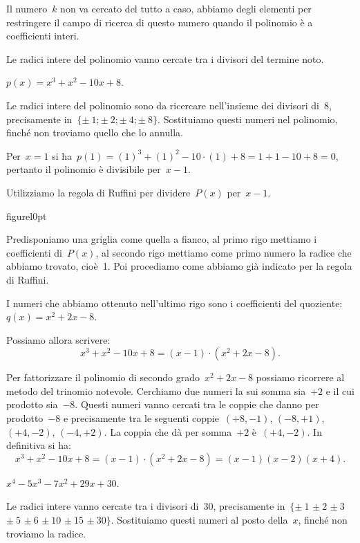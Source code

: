 Il numero~$k$ non va cercato del tutto a caso, abbiamo degli elementi per
restringere il campo di ricerca di questo numero quando il polinomio
è a coefficienti interi.

\osservazione Le radici intere del polinomio vanno cercate tra i divisori del 
termine noto.

\begin{exrig}
 \begin{esempio}
 $p(x)=x^{3}+x^{2}-10x+8$.
 \end{esempio}
Le radici intere del polinomio sono da ricercare
nell'insieme dei divisori di~8, precisamente in~$\{\pm~1;\pm~2;\pm~4;\pm~8\}$.
Sostituiamo questi numeri nel polinomio,
finché non troviamo quello che lo annulla.

Per~$x=1$ si ha~$p(1)=(1)^{3}+(1)^{2}-10\cdot (1)+8=1+1-10+8=0$,
pertanto il polinomio è divisibile per~$x-1$.

Utilizziamo la regola di Ruffini per dividere~$P(x)$ per~$x-1$.

\begin{wrapfloat}{figure}{l}{0pt}
 
\end{wrapfloat}

Predisponiamo una griglia come quella a fianco, al primo rigo mettiamo i
coefficienti di~$P(x)$, al secondo rigo mettiamo come primo numero la
radice che abbiamo trovato, cioè~1. Poi procediamo come abbiamo già
indicato per la regola di Ruffini.

I numeri che abbiamo ottenuto nell'ultimo rigo sono i
coefficienti del quoziente: $q(x)=x^{2}+2x-8$.

Possiamo allora scrivere:
\[x^{3}+x^{2}-10x+8=(x-1)\cdot (x^{2}+2x-8).\]

Per fattorizzare il polinomio di secondo grado~$x^{2}+2x-8$ possiamo
ricorrere al metodo del trinomio notevole. Cerchiamo due numeri la sui
somma sia~$+2$ e il cui prodotto sia~$-8$. Questi numeri vanno cercati tra
le coppie che danno per prodotto~$-8$ e precisamente tra le seguenti
coppie~$(+8, -1)$, $(-8, +1)$, $(+4, -2)$, $(-4, +2)$. La coppia che dà per
somma~$+2$ è~$(+4, -2)$. In definitiva si ha:
\[x^{3}+x^{2}-10x+8=(x-1)\cdot (x^{2}+2x-8)=(x-1)(x-2)(x+4).\]


 \begin{esempio}
$x^{4}-5x^{3}-7x^{2}+29x+30$.
\end{esempio}

Le radici intere vanno cercate tra i divisori di~30, precisamente 
in~$\{\pm~1$ $\pm~2$ $\pm~3$ $\pm~5$ $\pm~6$ $\pm~10$
$\pm~15$ $\pm~30\}$.
Sostituiamo questi numeri al posto della~$x$, finché non troviamo la radice.


\end{exrig}
